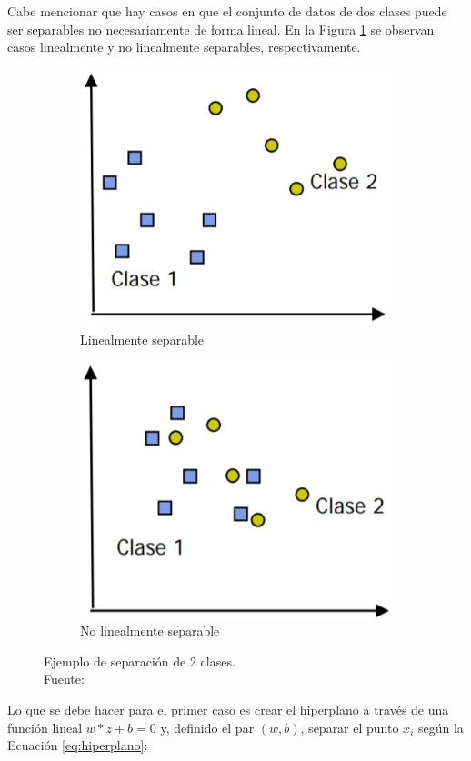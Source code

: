 \begin{itemize}
	Cabe mencionar que hay casos en que el conjunto de datos de dos clases puede ser separables no necesariamente de forma lineal. En la Figura \ref{2:fig36} se observan casos linealmente y no linealmente separables, respectivamente.
	\begin{figure}[!ht]
		\centering
		\small
		\begin{subfigure}{.5\textwidth}
			\centering
			\includegraphics[width=0.6\linewidth]{2/figures/caso1_svm.jpg}
			\caption{Linealmente separable}
		\end{subfigure}%
		\begin{subfigure}{.5\textwidth}
			\centering
			\includegraphics[width=0.6\linewidth]{2/figures/caso2_svm.jpg}
			\caption{No linealmente separable}
		\end{subfigure}
		\caption[Ejemplo de separación de 2 clases]{Ejemplo de separación de 2 clases.\\
		Fuente: \cite{tec_betancourt2005svm}}
		\label{2:fig36}
	\end{figure}
	
	
	Lo que se debe hacer para el primer caso es crear el hiperplano a través de una función lineal $w*z+b=0$ y, definido el par $(w,b)$, separar el punto $x_i$ según la Ecuación \ref{eq:hiperplano}:
	

\end{itemize}
